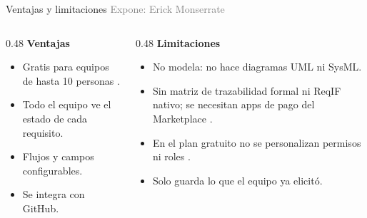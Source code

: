 \documentclass[aspectratio=169,11pt]{beamer}
\newcommand{\expone}[1]{\hfill{\scriptsize\textcolor{gray}{Expone: #1}}}
\begin{document}
\begin{frame}{Ventajas y limitaciones}
  \expone{Erick Monserrate}
  \begin{columns}[T]
    \begin{column}{0.48\textwidth}
      \textbf{Ventajas}
      \begin{itemize}
        \item Gratis para equipos de hasta 10 personas \cite{atlassianplans}.
        \item Todo el equipo ve el estado de cada requisito.
        \item Flujos y campos configurables.
        \item Se integra con GitHub.
      \end{itemize}
    \end{column}
    \begin{column}{0.48\textwidth}
      \textbf{Limitaciones}
      \begin{itemize}
        \item No modela: no hace diagramas UML ni SysML.
        \item Sin matriz de trazabilidad formal ni ReqIF nativo; se necesitan
              apps de pago del Marketplace \cite{r4jreqif}.
        \item En el plan gratuito no se personalizan permisos ni roles
              \cite{atlassianplans}.
        \item Solo guarda lo que el equipo ya elicitó.
      \end{itemize}
    \end{column}
  \end{columns}
\end{frame}
\end{document}
